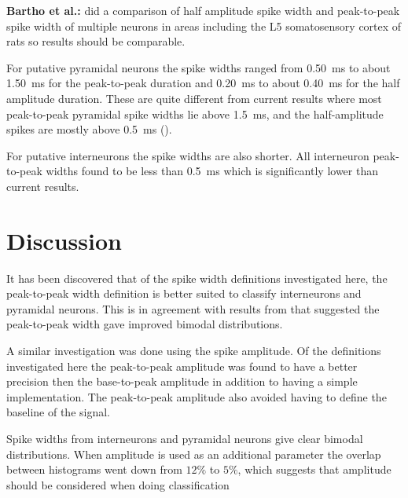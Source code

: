 \documentclass[altfont, fleqn]{uiophd}
\renewcommand{\cref}[1]{{\color{viridis_03}\mycref{#1}}}
\begin{document}
\noindent
{\bf Bartho et al.:}
\Textcite{bartho_characterization_2004}
did a comparison of half amplitude spike width and peak-to-peak spike
width of multiple neurons in areas including the 
L5 somatosensory cortex of rats 
so results should be comparable. 

For putative pyramidal neurons the 
spike widths ranged from 
\SI{0.50}{\milli\second} 
to about
\SI{1.50}{\milli\second} 
for the peak-to-peak duration 
and
\SI{0.20}{\milli\second} 
to about
\SI{0.40}{\milli\second} 
for the half amplitude duration. 
These are quite different from current results where
most peak-to-peak pyramidal spike widths lie above
\SI{1.5}{\milli\second}, 
and the half-amplitude spikes are mostly above
\SI{0.5}{\milli\second} 
(\cref{fig:4_width_I_II_histograms}).

For putative interneurons the 
spike widths are also shorter. 
All interneuron peak-to-peak widths found to be less than
\SI{0.5}{\milli\second} 
which is significantly lower than current results. 
\newline

\chapter{Discussion}
It has been discovered that of the spike width definitions 
investigated here, 
the peak-to-peak width definition is
better suited to classify interneurons and pyramidal neurons. 
This is in agreement with results from 
\textcite{bartho_characterization_2004} 
that suggested the peak-to-peak width gave improved
bimodal distributions. 

A similar investigation was done using the spike amplitude.
Of the 
definitions investigated here the peak-to-peak amplitude 
was found to have a better precision
then the base-to-peak amplitude in addition to having a
simple implementation. 
The peak-to-peak amplitude also avoided
having to define the baseline of the signal. 


Spike widths from interneurons and pyramidal neurons
give clear bimodal distributions. 
When amplitude is used as an additional parameter the overlap
between histograms went down from $12\%$ to $5\%$, 
which suggests that amplitude should be considered when 
doing classification 
\end{document}
